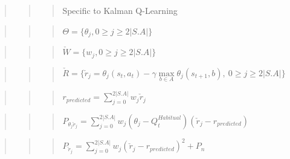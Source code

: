 \documentclass[10pt,a4paper,onecolumn]{article}
\begin{document}
\begin{quote}
\begin{quote}
\begin{quote}
Specific to Kalman Q-Learning
\end{quote}
\end{quote}
\end{quote}

\begin{quote}
\begin{quote}
\begin{quote}
\(\Theta = \{ \theta_j, 0 \geq j \geq 2|S.A|\}\)
\end{quote}
\end{quote}
\end{quote}

\begin{quote}
\begin{quote}
\begin{quote}
\(\check{W} = \{ w_j, 0 \geq j \geq 2|S.A| \}\)
\end{quote}
\end{quote}
\end{quote}

\begin{quote}
\begin{quote}
\begin{quote}
\(\check{R} = \{ \check{r}_j = \theta_j(s_t,a_t) - \gamma \max\limits_{b \in A} \theta_j(s_{t+1},b),\ 0 \geq j \geq 2|S.A|\}\)
\end{quote}
\end{quote}
\end{quote}

\begin{quote}
\begin{quote}
\begin{quote}
\(r_{predicted} = \sum\limits_{j=0}^{2|S.A|} w_j \check{r}_j\)
\end{quote}
\end{quote}
\end{quote}

\begin{quote}
\begin{quote}
\begin{quote}
\(P_{\theta_j \check{r}_j} = \sum\limits_{j=0}^{2|S.A|} w_j (\theta_j - Q^{Habitual}_t)(\check{r}_j - r_{predicted})\)
\end{quote}
\end{quote}
\end{quote}

\begin{quote}
\begin{quote}
\begin{quote}
\(P_{\check{r}_j} = \sum\limits_{j=0}^{2|S.A|} w_j (\check{r}_j - r_{predicted})^2 + P_n\)
\end{quote}
\end{quote}
\end{quote}
\end{document}
